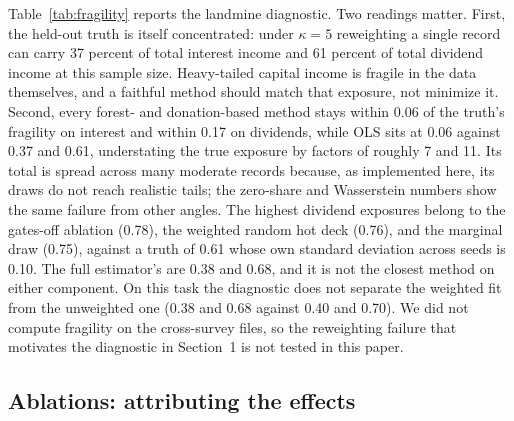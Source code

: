 Table~\ref{tab:fragility} reports the landmine diagnostic. Two readings
matter. First, the held-out truth is itself concentrated: under $\kappa=5$
reweighting a single record can carry 37 percent of total interest income
and 61 percent of total dividend income at this sample size. Heavy-tailed
capital income is fragile in the data themselves, and a faithful method
should match that exposure, not minimize it. Second, every forest-
and donation-based method stays within 0.06 of the truth's fragility on
interest and within 0.17 on dividends, while OLS sits at 0.06 against 0.37
and 0.61, understating the true exposure by factors of roughly 7 and 11.
Its total is spread across many
moderate records because, as implemented here, its draws do not reach
realistic tails; the
zero-share and Wasserstein numbers show the same failure from other angles.
The highest dividend exposures belong to the gates-off ablation (0.78), the
weighted random hot deck (0.76), and the marginal draw (0.75), against a
truth of 0.61 whose own standard deviation across seeds is 0.10. The full
estimator's are 0.38 and 0.68, and it is not the closest method on either
component.
On this task the diagnostic does not separate the weighted fit from the
unweighted one (0.38 and 0.68 against 0.40 and 0.70). We did not compute fragility on the cross-survey files, so
the reweighting failure that motivates the diagnostic in Section~1 is not
tested in this paper.

\subsection{Ablations: attributing the effects}
\label{sec:results-ablations}


